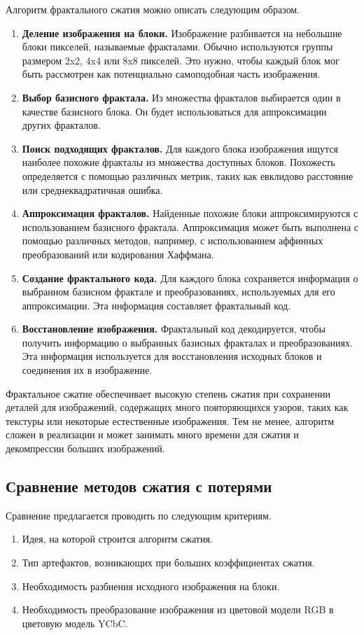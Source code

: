 Алгоритм фрактального сжатия можно описать следующим образом.
\begin{enumerate}
    \item \textbf{Деление изображения на блоки.} Изображение разбивается на небольшие блоки пикселей, называемые фракталами. Обычно используются группы размером 2x2, 4x4 или 8x8 пикселей. Это нужно, чтобы каждый блок мог быть рассмотрен как потенциально самоподобная часть изображения.
    \item \textbf{Выбор базисного фрактала.} Из множества фракталов выбирается один в качестве базисного блока. Он будет использоваться для аппроксимации других фракталов.
    \item \textbf{Поиск подходящих фракталов.} Для каждого блока изображения ищутся наиболее похожие фракталы из множества доступных блоков. Похожесть определяется с помощью различных метрик, таких как евклидово расстояние или среднеквадратичная ошибка.
    \item \textbf{Аппроксимация фракталов.} Найденные похожие блоки аппроксимируются с использованием базисного фрактала. Аппроксимация может быть выполнена с помощью различных методов, например, с использованием аффинных преобразований или кодирования Хаффмана.
    \item \textbf{Создание фрактального кода.} Для каждого блока сохраняется информация о выбранном базисном фрактале и преобразованиях, используемых для его аппроксимации. Эта информация составляет фрактальный код.
    \item \textbf{Восстановление изображения.} Фрактальный код декодируется, чтобы получить информацию о выбранных базисных фракталах и преобразованиях. Эта информация используется для восстановления исходных блоков и соединения их в изображение.
\end{enumerate}

Фрактальное сжатие обеспечивает высокую степень сжатия при сохранении деталей для изображений, содержащих много повторяющихся узоров, таких как текстуры или некоторые естественные изображения. Тем не менее, алгоритм сложен в реализации и может занимать много времени для сжатия и декомпрессии больших изображений.

\subsection{Сравнение методов сжатия с потерями}

Сравнение предлагается проводить по следующим критериям.
\begin{enumerate}
    \item Идея, на которой строится алгоритм сжатия.
    \item Тип артефактов, возникающих при больших коэффициентах сжатия.
    \item Необходимость разбиения исходного изображения на блоки.
    \item Необходимость преобразование изображения из цветовой модели RGB в цветовую модель YCbC.
\end{enumerate}

